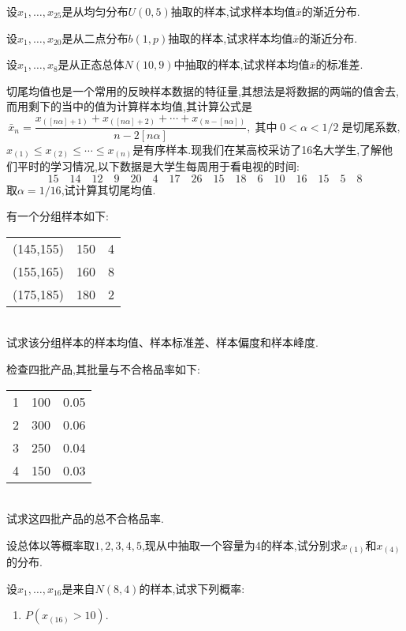 \begin{xiti}
\item 设$x_1,\dotsc,x_{25}$是从均匀分布$U(0,5)$抽取的样本,试求样本均值$\bar x$的渐近分布.
\item 设$x_1,\dotsc,x_{20}$是从二点分布$b(1,p)$抽取的样本,试求样本均值$\bar x$的渐近分布.
\item 设$x_1,\dotsc,x_{8}$是从正态总体$N(10,9)$中抽取的样本,试求样本均值$\bar x$的标准差.
\item 切尾均值也是一个常用的反映样本数据的特征量,其想法是将数据的两端的值舍去,而用剩下的当中的值为计算样本均值,其计算公式是
\[\bar x_n=\frac{x_{([n\alpha]+1)}+x_{([n\alpha]+2)}+\dotsb+x_{(n-[n\alpha])}}{n-2[n\alpha]},
 \;\text{其中}\; 0<\alpha<1/2 \;\text{是切尾系数} ,  \]
$x_{(1)}\leq x_{(2)}\leq\dotsb\leq x_{(n)}$是有序样本.现我们在某高校采访了16名大学生,了解他们平时的学习情况,以下数据是大学生每周用于看电视的时间:
\[15\quad14\quad12\quad9\quad20\quad4\quad17\quad26\quad15\quad18\quad6\quad10\quad16
\quad15\quad5\quad8\]
取$\alpha=1/16$,试计算其切尾均值.
\item 有一个分组样本如下:\\[2mm]
\begin{tabularx}{\textwidth}{YYY}
\toprule
{}&&\\
\midrule
(145,155)&150&4\\
(155,165)&160&8\\
(175,185)&180&2\\
\bottomrule
\end{tabularx}\\[2mm]
试求该分组样本的样本均值、样本标准差、样本偏度和样本峰度.
\item 检查四批产品,其批量与不合格品率如下:\\[2mm]
\begin{tabularx}{\textwidth}{YYY}
\toprule
{}&&\\
&100&0.05\\
2&300&0.06\\
3&250&0.04\\
4&150&0.03\\
\bottomrule
\end{tabularx}\\[2mm]
试求这四批产品的总不合格品率.
\item 设总体以等概率取$1,2,3,4,5$,现从中抽取一个容量为4的样本,试分别求$x_{(1)}$和$x_{(4)}$的分布.
\item 设$x_1,\dotsc,x_{16}$是来自$N(8,4)$的样本,试求下列概率:
\begin{enumerate}
\item $P(x_{(16)}>10)$.

\end{enumerate}
\end{xiti}
